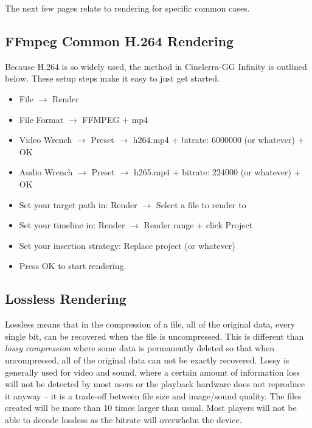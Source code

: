 \noindent The next few pages relate to rendering for specific common cases.

\subsection{FFmpeg Common H.264 Rendering}%
\label{sub:ffmpeg_h264_rendering}

Because H.264 is so widely used, the method in Cinelerra-GG Infinity is outlined below.  These setup steps make it easy to just get started.

\begin{itemize}
    \item File $\rightarrow$ Render
    \item File Format $\rightarrow$ FFMPEG + mp4
    \item Video Wrench $\rightarrow$ Preset $\rightarrow$ h264.mp4 + bitrate: 6000000 (or whatever) + OK
    \item Audio Wrench $\rightarrow$ Preset $\rightarrow$ h265.mp4 + bitrate: 224000 (or whatever) + OK
    \item Set your target path in: Render $\rightarrow$ Select a file to render to
    \item Set your timeline in: Render $\rightarrow$ Render range + click Project
    \item Set your insertion strategy: Replace project (or whatever)
    \item Press OK to start rendering.
\end{itemize}

\subsection{Lossless Rendering}%
\label{sub:loseeless_rendering}

Lossless means that in the compression of a file, all of the original data, every single bit, can be recovered when the file is uncompressed.  This is different than \textit{lossy compression} where some data is permanently deleted so that when uncompressed, all of the original data can not be exactly recovered.  Lossy is generally used for video and sound, where a certain amount of information loss will not be detected by most users or the playback hardware does not reproduce it anyway -- it is a trade-off between file size and image/sound quality.  The files created will be more than 10 times larger than usual.  Most players will not be able to decode lossless as the bitrate will overwhelm the device.

